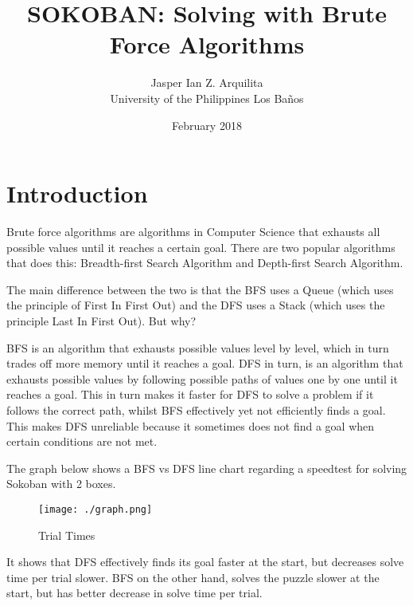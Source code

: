 \documentclass[11pt]{article}
\title{\bf SOKOBAN: Solving with Brute Force Algorithms}
\author{Jasper Ian Z. Arquilita\\
\small University of the
Philippines Los Ba\~{n}os}
\date{\small February 2018} %
\begin{document}
\maketitle

\section{Introduction}

Brute force algorithms are algorithms in Computer Science that exhausts all possible values until it reaches a certain goal. There are two popular algorithms that does this: Breadth-first Search Algorithm and Depth-first Search Algorithm.

The main difference between the two is that the BFS uses a Queue (which uses the principle of First In First Out) and the DFS uses a Stack (which uses the principle Last In First Out). But why?

BFS is an algorithm that exhausts possible values level by level, which in turn trades off more memory until it reaches a goal. DFS in turn, is an algorithm that exhausts possible values by following possible paths of values one by one until it reaches a goal. This in turn makes it faster for DFS to solve a problem if it follows the correct path, whilst BFS effectively yet not efficiently finds a goal. This makes DFS unreliable because it sometimes does not find a goal when certain conditions are not met.

The graph below shows a BFS vs DFS line chart regarding a speedtest for solving Sokoban with 2 boxes.

\begin{figure}
\begin{center}
	\texttt{[image: ./graph.png]}
	\caption{Trial Times}
\end{center}
\end{figure}

It shows that DFS effectively finds its goal faster at the start, but decreases solve time per trial slower. BFS on the other hand, solves the puzzle slower at the start, but has better decrease in solve time per trial.
\end{document}
